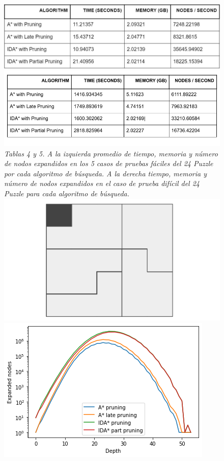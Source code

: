 \documentclass[a4paper,10pt]{article}
\begin{document}
  
    \begin{figure}[t!]
      \centering
      \includegraphics[scale=0.32]{24puzzle/24p_tabla_prom.jpg} 
      \includegraphics[scale=0.3]{24puzzle/tabla1.png} \\
      \textit{\small{Tablas 4 y 5. A la izquierda promedio de tiempo, memoria y n\'umero 
      de nodos expandidos en los 5 casos de pruebas f\'aciles del 24 Puzzle por cada algoritmo 
      de b\'usqueda. A la derecha tiempo, memoria y n\'umero de nodos expandidos en el caso
      de prueba dif\'icil del 24 Puzzle para cada algoritmo de b\'usqueda.}}\\
      \includegraphics[scale=0.2]{24puzzle/pdb.png}
      \includegraphics[scale=0.4]{24puzzle/24puzzle_hard.png}

\end{figure}
\end{document}
